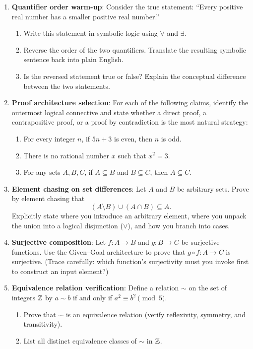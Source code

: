 \begin{enumerate}
  \item \textbf{Quantifier order warm-up}: Consider the true statement: ``Every positive real number has a smaller positive real number.''
  \begin{enumerate}
    \item Write this statement in symbolic logic using $\forall$ and $\exists$.
    \item Reverse the order of the two quantifiers. Translate the resulting symbolic sentence back into plain English.
    \item Is the reversed statement true or false? Explain the conceptual difference between the two statements.
  \end{enumerate}

  \item \textbf{Proof architecture selection}: For each of the following claims, identify the outermost logical connective and state whether a direct proof, a contrapositive proof, or a proof by contradiction is the most natural strategy:
  \begin{enumerate}
    \item For every integer $n$, if $5n + 3$ is even, then $n$ is odd.
    \item There is no rational number $x$ such that $x^2 = 3$.
    \item For any sets $A, B, C$, if $A \subseteq B$ and $B \subseteq C$, then $A \subseteq C$.
  \end{enumerate}

  \item \textbf{Element chasing on set differences}: Let $A$ and $B$ be arbitrary sets. Prove by element chasing that
  \[
  (A \setminus B) \cup (A \cap B) \subseteq A.
  \]
  Explicitly state where you introduce an arbitrary element, where you unpack the union into a logical disjunction ($\lor$), and how you branch into cases.

  \item \textbf{Surjective composition}: Let $f: A \to B$ and $g: B \to C$ be surjective functions. Use the Given--Goal architecture to prove that $g \circ f: A \to C$ is surjective. (Trace carefully: which function's surjectivity must you invoke first to construct an input element?)

  \item \textbf{Equivalence relation verification}: Define a relation $\sim$ on the set of integers $\mathbb{Z}$ by $a \sim b$ if and only if $a^2 \equiv b^2 \pmod 5$.
  \begin{enumerate}
    \item Prove that $\sim$ is an equivalence relation (verify reflexivity, symmetry, and transitivity).
    \item List all distinct equivalence classes of $\sim$ in $\mathbb{Z}$.
  \end{enumerate}


\end{enumerate}
